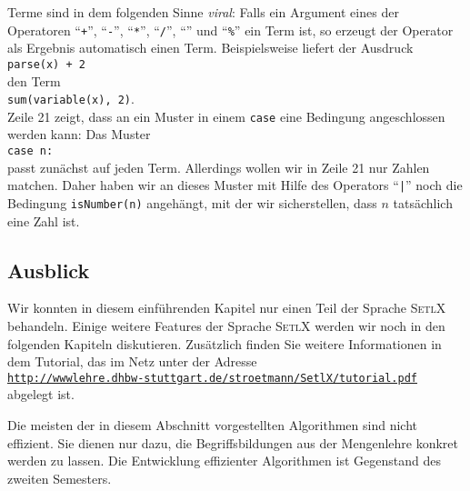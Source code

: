 Terme sind in dem folgenden Sinne \emph{viral}:  Falls ein Argument eines der Operatoren
``\texttt{+}'', ``\texttt{-}'', ``\texttt{*}'', ``\texttt{/}'', ``\texttt{}'' und
``\texttt{\%}''
ein Term ist, so erzeugt der Operator als Ergebnis automatisch einen Term.
Beispielsweise liefert der Ausdruck
\\[0.2cm]
\hspace*{1.3cm}
\texttt{parse(x) + 2}
\\[0.2cm]
den Term
\\[0.2cm]
\hspace*{1.3cm}
\texttt{sum(variable(x), 2)}.
\\[0.2cm]
Zeile 21 zeigt, dass an ein Muster in einem \texttt{case} eine Bedingung angeschlossen werden kann:
Das Muster
\\[0.2cm]
\hspace*{1.3cm}
\texttt{case n:}
\\[0.2cm]
passt zunächst auf jeden Term.  Allerdings wollen wir in Zeile 21 nur Zahlen matchen.  Daher haben
wir an dieses Muster mit Hilfe des Operators ``\texttt{|}'' noch die Bedingung \texttt{isNumber(n)}
angehängt, mit der wir sicherstellen, dass $n$ tatsächlich eine Zahl ist.


\subsection{Ausblick}
Wir konnten in diesem einführenden Kapitel nur einen Teil der Sprache \textsc{SetlX}
behandeln.  Einige weitere Features
der Sprache \textsc{SetlX} werden wir noch in den folgenden Kapiteln diskutieren.
Zusätzlich finden Sie
weitere Informationen  in dem Tutorial, das im Netz unter der Adresse
\\[0.2cm]
\hspace*{1.3cm}
\href{http://wwwlehre.dhbw-stuttgart.de/stroetmann/SetlX/tutorial.pdf}{\texttt{http://wwwlehre.dhbw-stuttgart.de/stroetmann/SetlX/tutorial.pdf}}
\\[0.2cm]
abgelegt ist.  

\remark
Die meisten der in diesem Abschnitt vorgestellten Algorithmen sind 
nicht effizient.  Sie dienen nur dazu, die Begriffsbildungen aus der Mengenlehre konkret
werden zu lassen.  Die Entwicklung effizienter Algorithmen ist Gegenstand des zweiten
Semesters. 




